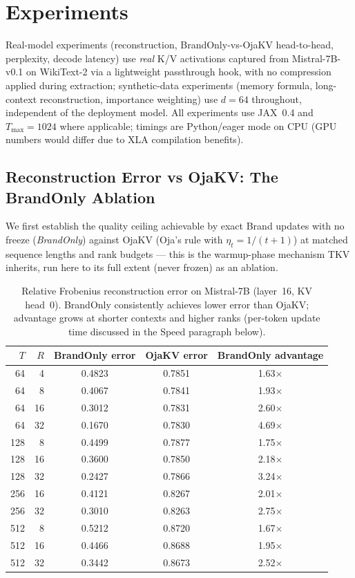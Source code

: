 \documentclass{article}
\begin{document}
\section{Experiments}
\label{sec:experiments}

Real-model experiments (reconstruction, BrandOnly-vs-OjaKV head-to-head,
perplexity, decode latency) use \emph{real} K/V activations captured from
Mistral-7B-v0.1 on WikiText-2 via a lightweight passthrough hook, with no
compression applied during extraction; synthetic-data experiments (memory
formula, long-context reconstruction, importance weighting) use $d=64$
throughout, independent of the deployment model.  All experiments use
JAX~0.4 and $T_{\max}=1024$ where applicable; timings are Python/eager
mode on CPU (GPU numbers would differ due to XLA compilation benefits).

\subsection{Reconstruction Error vs OjaKV: The BrandOnly Ablation}
\label{sec:brandonly-ablation}

We first establish the quality ceiling achievable by exact Brand updates
with no freeze (\emph{BrandOnly}) against OjaKV (Oja's rule with
$\eta_t = 1/(t+1)$) at matched sequence lengths and rank budgets --- this
is the warmup-phase mechanism TKV inherits, run here to its full extent
(never frozen) as an ablation.

\begin{table}[t]
\centering
\caption{Relative Frobenius reconstruction error on Mistral-7B (layer~16,
KV head~0).  BrandOnly consistently achieves lower error than OjaKV;
advantage grows at shorter contexts and higher ranks (per-token update time
discussed in the Speed paragraph below).}
\label{tab:recon}
\small
\begin{tabular}{rrccc}
\toprule
$T$ & $R$ & BrandOnly error & OjaKV error & BrandOnly advantage \\
\midrule
 64 &  4 & 0.4823 & 0.7851 & 1.63$\times$ \\
 64 &  8 & 0.4067 & 0.7841 & 1.93$\times$ \\
 64 & 16 & 0.3012 & 0.7831 & 2.60$\times$ \\
 64 & 32 & 0.1670 & 0.7830 & 4.69$\times$ \\
\midrule
128 &  8 & 0.4499 & 0.7877 & 1.75$\times$ \\
128 & 16 & 0.3600 & 0.7850 & 2.18$\times$ \\
128 & 32 & 0.2427 & 0.7866 & 3.24$\times$ \\
\midrule
256 & 16 & 0.4121 & 0.8267 & 2.01$\times$ \\
256 & 32 & 0.3010 & 0.8263 & 2.75$\times$ \\
\midrule
512 &  8 & 0.5212 & 0.8720 & 1.67$\times$ \\
512 & 16 & 0.4466 & 0.8688 & 1.95$\times$ \\
512 & 32 & 0.3442 & 0.8673 & 2.52$\times$ \\
\bottomrule
\end{tabular}
\normalsize
\end{table}
\end{document}
